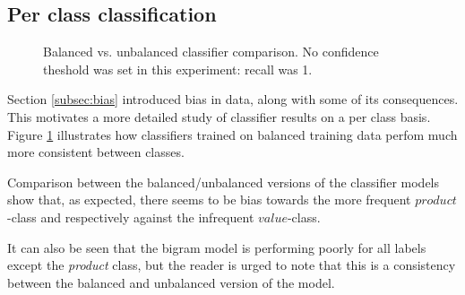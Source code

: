 \documentclass[a4paper,11pt]{kth-mag}
\begin{document}
\subsection{Per class classification}
\begin{figure}[t]
  \centering
  \caption{Balanced vs. unbalanced classifier comparison. No confidence theshold was set in this experiment: recall was 1.}
  \label{fig:per_cat}
\end{figure}

Section \ref{subsec:bias} introduced bias in data, along with some of its consequences. This motivates a more detailed study of classifier results on a per class basis. Figure \ref{fig:per_cat} illustrates how classifiers trained on balanced training data perfom much more consistent between classes.

Comparison between the balanced/unbalanced versions of the classifier models show that, as expected, there seems to be bias towards the more frequent $product$-class and respectively against the infrequent $value$-class.

It can also be seen that the bigram model is performing poorly for all labels except the \emph{product} class, but the reader is urged to note that this is a consistency between the balanced and unbalanced version of the model.

\newpage
\end{document}
